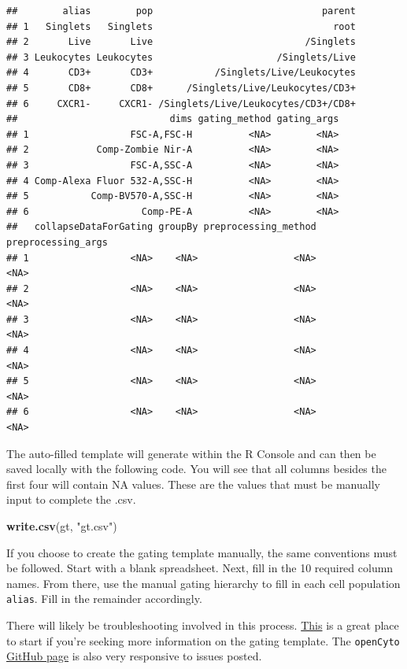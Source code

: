 \documentclass[]{book}
\newenvironment{Shaded}{\begin{snugshade}}{\end{snugshade}}
\newcommand{\KeywordTok}[1]{\textcolor[rgb]{0.13,0.29,0.53}{\textbf{#1}}}
\newcommand{\NormalTok}[1]{#1}
\newcommand{\StringTok}[1]{\textcolor[rgb]{0.31,0.60,0.02}{#1}}
\begin{document}
\begin{verbatim}
##        alias        pop                              parent
## 1   Singlets   Singlets                                root
## 2       Live       Live                           /Singlets
## 3 Leukocytes Leukocytes                      /Singlets/Live
## 4       CD3+       CD3+           /Singlets/Live/Leukocytes
## 5       CD8+       CD8+      /Singlets/Live/Leukocytes/CD3+
## 6     CXCR1-     CXCR1- /Singlets/Live/Leukocytes/CD3+/CD8+
##                           dims gating_method gating_args
## 1                  FSC-A,FSC-H          <NA>        <NA>
## 2            Comp-Zombie Nir-A          <NA>        <NA>
## 3                  FSC-A,SSC-A          <NA>        <NA>
## 4 Comp-Alexa Fluor 532-A,SSC-H          <NA>        <NA>
## 5           Comp-BV570-A,SSC-H          <NA>        <NA>
## 6                    Comp-PE-A          <NA>        <NA>
##   collapseDataForGating groupBy preprocessing_method preprocessing_args
## 1                  <NA>    <NA>                 <NA>               <NA>
## 2                  <NA>    <NA>                 <NA>               <NA>
## 3                  <NA>    <NA>                 <NA>               <NA>
## 4                  <NA>    <NA>                 <NA>               <NA>
## 5                  <NA>    <NA>                 <NA>               <NA>
## 6                  <NA>    <NA>                 <NA>               <NA>
\end{verbatim}

The auto-filled template will generate within the R Console and can then be saved locally with the following code. You will see that all columns besides the first four will contain NA values. These are the values that must be manually input to complete the .csv.

\begin{Shaded}
\begin{Highlighting}[]
\KeywordTok{write.csv}\NormalTok{(gt, }\StringTok{"gt.csv"}\NormalTok{)}
\end{Highlighting}
\end{Shaded}

If you choose to create the gating template manually, the same conventions must be followed. Start with a blank spreadsheet. Next, fill in the 10 required column names. From there, use the manual gating hierarchy to fill in each cell population \texttt{alias}. Fill in the remainder accordingly.

There will likely be troubleshooting involved in this process. \href{https://www.bioconductor.org/packages/devel/bioc/vignettes/openCyto/inst/doc/HowToWriteCSVTemplate.html\#14_gating_method_that_generates_multiple_populations}{This} is a great place to start if you're seeking more information on the gating template. The \texttt{openCyto} \href{https://github.com/RGLab/openCyto}{GitHub page} is also very responsive to issues posted.
\end{document}
